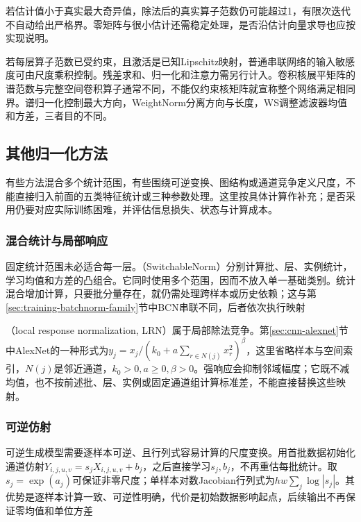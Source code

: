 若估计值小于真实最大奇异值，除法后的真实算子范数仍可能超过1，有限次迭代不自动给出严格界。零矩阵与很小估计还需稳定处理，是否沿估计向量求导也应按实现说明。

若每层算子范数已受约束，且激活是已知Lipschitz映射，普通串联网络的输入敏感度可由尺度乘积控制。残差求和、归一化和注意力需另行计入。卷积核展平矩阵的谱范数与完整空间卷积算子通常不同，不能仅约束核矩阵就宣称整个网络满足相同界。谱归一化控制最大方向，WeightNorm分离方向与长度，WS调整滤波器均值和方差，三者目的不同。

\subsection{其他归一化方法}
\label{sec:training-other-normalization}
有些方法混合多个统计范围，有些围绕可逆变换、图结构或通道竞争定义尺度，不能直接归入前面的五类特征统计或三种参数处理。这里按具体计算作补充；是否采用仍要对应实际训练困难，并评估信息损失、状态与计算成本。

\subsubsection{混合统计与局部响应}
\label{sec:training-normalization-combinations}
\label{sec:training-switchable-bcn}
固定统计范围未必适合每一层。（SwitchableNorm）分别计算批、层、实例统计，学习均值和方差的凸组合。它同时使用多个范围，因而不放入单一基础类别。统计混合增加计算，只要批分量存在，就仍需处理跨样本或历史依赖；这与第\ref{sec:training-batchnorm-family}节中BCN串联不同，后者依次执行映射

（local response normalization, LRN）属于局部除法竞争。第\ref{sec:cnn-alexnet}节中AlexNet的一种形式为$y_j=x_j/(k_0+a\sum_{r\in N(j)}x_r^2)^\beta$，这里省略样本与空间索引，$N(j)$是邻近通道，$k_0>0,a\geq0,\beta>0$。强响应会抑制邻域幅度；它既不减均值，也不按前述批、层、实例或固定通道组计算标准差，不能直接替换这些映射。

\subsubsection{可逆仿射}
\label{sec:training-actnorm}
可逆生成模型需要逐样本可逆、且行列式容易计算的尺度变换。用首批数据初始化通道仿射$Y_{i,j,u,v}=s_jX_{i,j,u,v}+b_j$，之后直接学习$s_j,b_j$，不再重估每批统计。取$s_j=\exp(a_j)$可保证非零尺度；单样本对数Jacobian行列式为$hw\sum_j\log|s_j|$。其优势是逐样本计算一致、可逆性明确，代价是初始数据影响起点，后续输出不再保证零均值和单位方差

